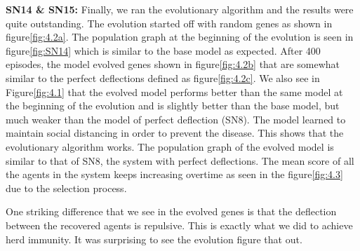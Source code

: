 \documentclass[a4paper,11pt]{article}
\begin{document}
    \textbf{SN14  \& SN15:} Finally, we ran the evolutionary algorithm and the results were quite outstanding.
    The evolution started off with random genes as shown in figure\ref{fig:4.2a}.
    The population graph at the beginning of the evolution is seen in figure\ref{fig:SN14} which is similar to the base model as expected.
    After 400 episodes, the model evolved genes shown in figure\ref{fig:4.2b} that are somewhat similar to the perfect deflections defined as figure\ref{fig:4.2c}.
    We also see in Figure\ref{fig:4.1} that the evolved model performs better than the same model at the beginning of the evolution and is slightly better than the base model, but much weaker than the model of perfect deflection (SN8).
    The model learned to maintain social distancing in order to prevent the disease.
    This shows that the evolutionary algorithm works.
    The population graph of the evolved model is similar to that of SN8, the system with perfect deflections.
    The mean score of all the agents in the system keeps increasing overtime as seen in the figure\ref{fig:4.3} due to the selection process.

    One striking difference that we see in the evolved genes is that the deflection between the recovered agents is repulsive.
    This is exactly what we did to achieve herd immunity.
    It was surprising to see the evolution figure that out.
\end{document}
